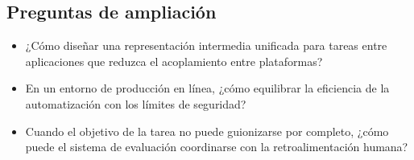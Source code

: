 \subsection{Preguntas de ampliación}
\begin{itemize}
    \item ¿Cómo diseñar una representación intermedia unificada para tareas entre aplicaciones que reduzca el acoplamiento entre plataformas?
    \item En un entorno de producción en línea, ¿cómo equilibrar la eficiencia de la automatización con los límites de seguridad?
    \item Cuando el objetivo de la tarea no puede guionizarse por completo, ¿cómo puede el sistema de evaluación coordinarse con la retroalimentación humana?
\end{itemize}


